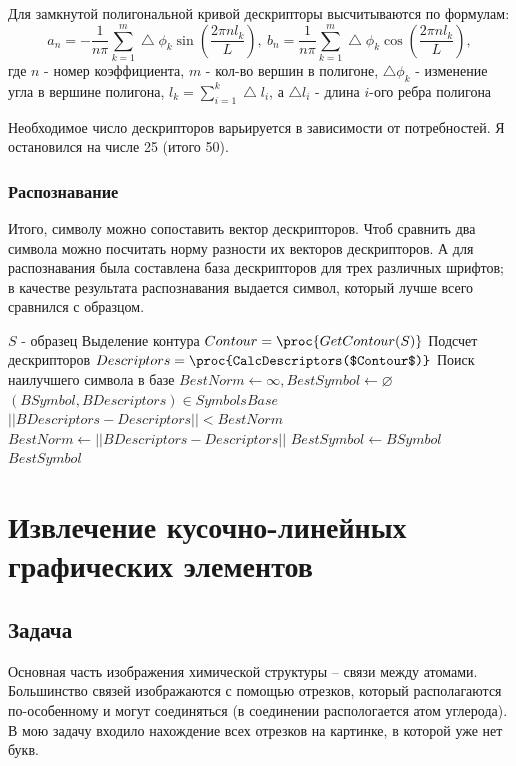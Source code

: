 Для замкнутой полигональной кривой дескрипторы высчитываются по формулам:
\[
  a_n = -\frac{1}{n\pi}\sum_{k=1}^{m}\bigtriangleup\phi_k\sin(\frac{2\pi n l_k}{L}),~
  b_n = \frac{1}{n\pi}\sum_{k=1}^{m}\bigtriangleup\phi_k\cos(\frac{2\pi n l_k}{L}),
\]
где $n$ - номер коэффициента, $m$ - кол-во вершин в полигоне, $\bigtriangleup\phi_k$ - изменение угла в вершине полигона,
$l_k = \sum_{i=1}^{k}\bigtriangleup l_i$, а $\bigtriangleup l_i$ - длина $i$-ого ребра полигона

Необходимое число дескрипторов варьируется в зависимости от потребностей. Я остановился на числе 25 (итого 50).
\subsubsection*{Распознавание}
\par Итого, символу можно сопоставить вектор дескрипторов. Чтоб сравнить два символа можно посчитать норму разности их 
векторов дескрипторов. А для распознавания была составлена база дескрипторов для трех различных шрифтов; в качестве 
результата распознавания выдается символ, который лучше всего сравнился с образцом.

\begin{codebox}
  \li \Comment $S$ - образец
  \li
  \li \Comment Выделение контура
  \li $Contour = \proc{GetContour(S)}$
  \li
  \li \Comment Подсчет дескрипторов
  \li $Descriptors = \proc{CalcDescriptors($Contour$)}$
  \li
  \li \Comment Поиск наилучшего символа в базе
  \li $BestNorm \gets \infty, BestSymbol \gets \varnothing$
  \li \For $(BSymbol, BDescriptors) \in SymbolsBase$
    \li \Do
    \li	\If $||BDescriptors - Descriptors|| < BestNorm$
    \li \Then
    \li $BestNorm \gets ||BDescriptors - Descriptors||$
    \li $BestSymbol \gets BSymbol$
    \li \End
  \li \End
  \li \Return $BestSymbol$
\end{codebox}

\section{Извлечение кусочно-линейных графических элементов}
\subsection{Задача}
Основная часть изображения химической структуры -- связи между атомами. Большинство связей изображаются с помощью
отрезков, который располагаются по-особенному и могут соединяться (в соединении распологается атом углерода). В мою 
задачу входило нахождение всех отрезков на картинке, в которой уже нет букв.

